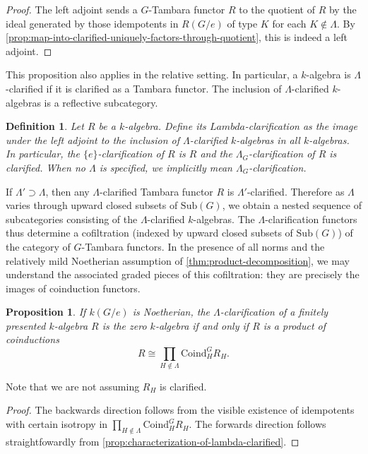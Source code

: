 \documentclass[11pt,dvipsnames]{amsart}
\newtheorem{proposition}[theorem]{Proposition}
\theoremstyle{BoldRemark}
\newtheorem{definition}[theorem]{Definition}
\begin{document}
\begin{proof}
	The left adjoint sends a $G$-Tambara functor $R$ to the quotient of $R$ by the ideal generated by those idempotents in $R(G/e)$ of type $K$ for each $K \notin \Lambda$. By \cref{prop:map-into-clarified-uniquely-factors-through-quotient}, this is indeed a left adjoint.
\end{proof}

This proposition also applies in the relative setting. In particular, a $k$-algebra is $\Lambda$-clarified if it is clarified as a Tambara functor. The inclusion of $\Lambda$-clarified $k$-algebras is a reflective subcategory.

\begin{definition}
	Let $R$ be a $k$-algebra. Define its \emph{$Lambda$-clarification} as the image under the left adjoint to the inclusion of $\Lambda$-clarified $k$-algebras in all $k$-algebras. In particular, the $\{ e \}$-clarification of $R$ is $R$ and the $\Lambda_G$-clarification of $R$ is clarified. When no $\Lambda$ is specified, we implicitly mean $\Lambda_G$-clarification.
\end{definition}

If $\Lambda' \supset \Lambda$, then any $\Lambda$-clarified Tambara functor $R$ is $\Lambda'$-clarified. Therefore as $\Lambda$ varies through upward closed subsets of $\mathrm{Sub}(G)$, we obtain a nested sequence of subcategories consisting of the $\Lambda$-clarified $k$-algebras. The $\Lambda$-clarification functors thus determine a cofiltration (indexed by upward closed subsets of $\mathrm{Sub}(G)$) of the category of $G$-Tambara functors. In the presence of all norms and the relatively mild Noetherian assumption of \cref{thm:product-decomposition}, we may understand the associated graded pieces of this cofiltration: they are precisely the images of coinduction functors.

\begin{proposition}\label{prop:SES-for-Lambda-clarification}
	If $k(G/e)$ is Noetherian, the $\Lambda$-clarification of a finitely presented $k$-algebra $R$ is the zero $k$-algebra if and only if $R$ is a product of coinductions \[ R \cong \prod_{H \notin \Lambda} \mathrm{Coind}_H^G R_H . \]
\end{proposition}

Note that we are not assuming $R_H$ is clarified.

\begin{proof}
	The backwards direction follows from the visible existence of idempotents with certain isotropy in $\prod_{H \notin \Lambda} \mathrm{Coind}_H^G R_H$. The forwards direction follows straightfowardly from \cref{prop:characterization-of-lambda-clarified}.
\end{proof}
\end{document}
